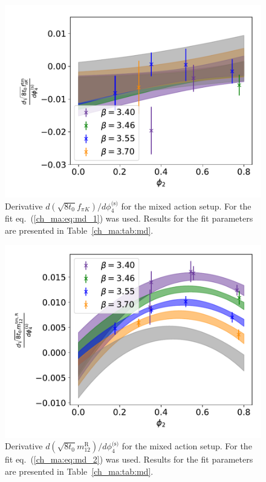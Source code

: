 \begin{figure}
    \centering
    \includegraphics[width=1.\textwidth]{./cap4/figs/der_sea_t0fpik.pdf}
    \caption{Derivative $d\left(\sqrt{8t_0}f_{\pi K}\right)/d\phi_4^{\textrm{(s)}}$ for the mixed action setup. For the fit eq.~(\ref{ch_ma:eq:md_1}) was used. Results for the fit parameters are presented in Table~\ref{ch_ma:tab:md}.}
    \label{ch_ma:fig:dfpik_tm}
\end{figure}

\begin{figure}
    \centering
    \includegraphics[width=1.\textwidth]{./cap4/figs/der_sea_t0m12.pdf}
    \caption{Derivative $d\left(\sqrt{8t_0}m_{12}^{\textrm{R}}\right)/d\phi_4^{\textrm{(s)}}$ for the mixed action setup. For the fit eq.~(\ref{ch_ma:eq:md_2}) was used. Results for the fit parameters are presented in Table~\ref{ch_ma:tab:md}.}
    \label{ch_ma:fig:dm12_tm}
\end{figure}


